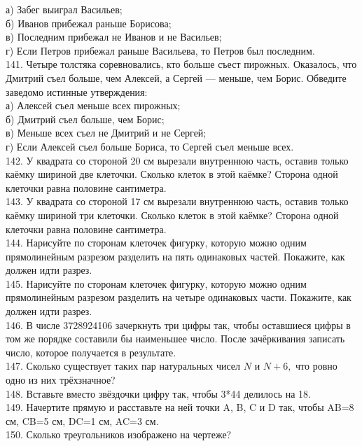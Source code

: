 а) Забег выиграл Васильев;\\
б) Иванов прибежал раньше Борисова;\\
в) Последним прибежал не Иванов и не Васильев;\\
г) Если Петров прибежал раньше Васильева, то Петров был последним.\\
141. Четыре толстяка соревновались, кто больше съест пирожных. Оказалось, что Дмитрий съел больше, чем Алексей, а Сергей --- меньше, чем Борис. Обведите заведомо истинные утверждения:\\
а) Алексей съел меньше всех пирожных;\\
б) Дмитрий съел больше, чем Борис;\\
в) Меньше всех съел не Дмитрий и не Сергей;\\
г) Если Алексей съел больше Бориса, то Сергей съел меньше всех.\\
142. У квадрата со стороной 20 см вырезали внутреннюю часть, оставив только каёмку шириной две клеточки. Сколько клеток в этой каёмке? Сторона одной клеточки равна половине сантиметра.\\
143. У квадрата со стороной 17 см вырезали внутреннюю часть, оставив только каёмку шириной три клеточки. Сколько клеток в этой каёмке? Сторона одной клеточки равна половине сантиметра.\\
144. Нарисуйте по сторонам клеточек фигурку, которую можно одним прямолинейным разрезом разделить на пять одинаковых частей. Покажите, как должен идти разрез.\\
145. Нарисуйте по сторонам клеточек фигурку, которую можно одним прямолинейным разрезом разделить на четыре одинаковых части. Покажите, как должен идти разрез.\\
146. В числе 3728924106 зачеркнуть три цифры так, чтобы оставшиеся цифры в том же порядке составили бы наименьшее число. После зачёркивания записать число, которое получается в результате.\\
147. Сколько существует таких пар натуральных чисел $N$ и $N+6,$ что ровно одно из них трёхзначное?\\
148. Вставьте вместо звёздочки цифру так, чтобы 3*44 делилось на 18.\\
149. Начертите прямую и расставьте на ней точки A, B, C и D так, чтобы AB=8 см, CB=5 см, DC=1 см, AC=3 см.\\
150. Сколько треугольников изображено на чертеже?
\begin{center}
\begin{figure}[ht!]
\end{figure}
\end{center}

